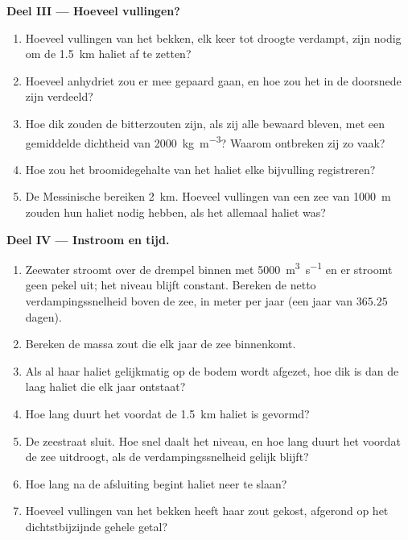 \begin{problem}
\noindent\textbf{Deel III --- Hoeveel vullingen?}
\begin{enumerate}[resume]
  \item Hoeveel vullingen van het bekken, elk keer tot droogte verdampt, zijn nodig om de \qty{1.5}{km} haliet af te zetten?
  \item Hoeveel anhydriet zou er mee gepaard gaan, en hoe zou het in de doorsnede zijn verdeeld?
  \item Hoe dik zouden de bitterzouten zijn, als zij alle bewaard bleven, met een gemiddelde dichtheid van \qty{2000}{kg.m^{-3}}? Waarom ontbreken zij zo vaak?
  \item Hoe zou het broomidegehalte van het haliet elke bijvulling registreren?
  \item De Messinische  bereiken \qty{2}{km}. Hoeveel vullingen van een zee van \qty{1000}{m} zouden hun haliet nodig hebben, als het allemaal haliet was?
\end{enumerate}

\noindent\textbf{Deel IV --- Instroom en tijd.}
\begin{enumerate}[resume]
  \item Zeewater stroomt over de drempel binnen met \qty{5000}{m^3.s^{-1}} en er stroomt geen pekel uit; het niveau blijft constant. Bereken de netto verdampingssnelheid boven de zee, in meter per jaar (een jaar van $365.25$ dagen).
  \item Bereken de massa zout die elk jaar de zee binnenkomt.
  \item Als al haar haliet gelijkmatig op de bodem wordt afgezet, hoe dik is dan de laag haliet die elk jaar ontstaat?
  \item Hoe lang duurt het voordat de \qty{1.5}{km} haliet is gevormd?
  \item De zeestraat sluit. Hoe snel daalt het niveau, en hoe lang duurt het voordat de zee uitdroogt, als de verdampingssnelheid gelijk blijft?
  \item Hoe lang na de afsluiting begint haliet neer te slaan?
  \item Hoeveel vullingen van het bekken heeft haar zout gekost, afgerond op het dichtstbijzijnde gehele getal?
\end{enumerate}
\end{problem}
